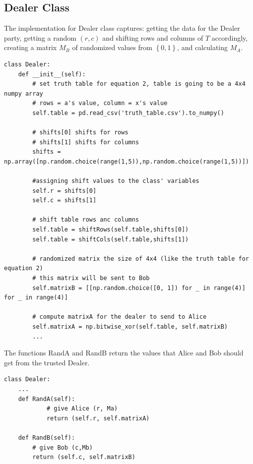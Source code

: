 \documentclass{article}
\begin{document}
\subsection{Dealer Class}
The implementation for Dealer class captures: getting the data for the Dealer party, getting a random $(r,c)$ and shifting rows and columns of $T$ accordingly, creating a matrix $M_B$ of randomized values from $\left\{0,1\right\}$, and calculating $M_A$.
\begin{lstlisting}
class Dealer:
    def __init__(self):
        # set truth table for equation 2, table is going to be a 4x4 numpy array 
        # rows = a's value, column = x's value
        self.table = pd.read_csv('truth_table.csv').to_numpy()
        
        # shifts[0] shifts for rows
        # shifts[1] shifts for columns
        shifts = np.array([np.random.choice(range(1,5)),np.random.choice(range(1,5))])
        
        #assigning shift values to the class' variables
        self.r = shifts[0]
        self.c = shifts[1]
        
        # shift table rows anc columns
        self.table = shiftRows(self.table,shifts[0])
        self.table = shiftCols(self.table,shifts[1])
        
        # randomized matrix the size of 4x4 (like the truth table for equation 2)
        # this matrix will be sent to Bob
        self.matrixB = [[np.random.choice([0, 1]) for _ in range(4)] for _ in range(4)]
        
        # compute matrixA for the dealer to send to Alice
        self.matrixA = np.bitwise_xor(self.table, self.matrixB)
        ...
\end{lstlisting}

The functions RandA and RandB return the values that Alice and Bob should get from the trusted Dealer.
\begin{lstlisting}
class Dealer:
    ...
    def RandA(self):
            # give Alice (r, Ma)
            return (self.r, self.matrixA)
    
    def RandB(self):
        # give Bob (c,Mb)
        return (self.c, self.matrixB)
\end{lstlisting}
\end{document}
